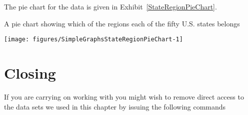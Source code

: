The pie chart for the  data is given in Exhibit~\ref{StateRegionPieChart}. 
\begin{exhibit} 
\begin{center} 
\caption{A pie chart showing which of the regions each of the fifty U.S. states belongs} 
\label{StateRegionPieChart} 
\begin{knitrout}
\color{fgcolor}\begin{kframe}
\begin{alltt}
\hlstd{> }\hlstd{(}
\end{alltt}
\end{kframe}
\texttt{[image: figures/SimpleGraphsStateRegionPieChart-1]} 

\end{knitrout}
\end{center} 
\end{exhibit} 
 
 
\section{Closing} 
 
If you are carrying on working with \R{} you might wish to remove direct access to the data sets we used in this chapter by issuing the following commands 
\begin{knitrout}
\color{fgcolor}\begin{kframe}
\begin{alltt}
\hlstd{> }
\end{alltt}
\end{kframe}
\end{knitrout}


